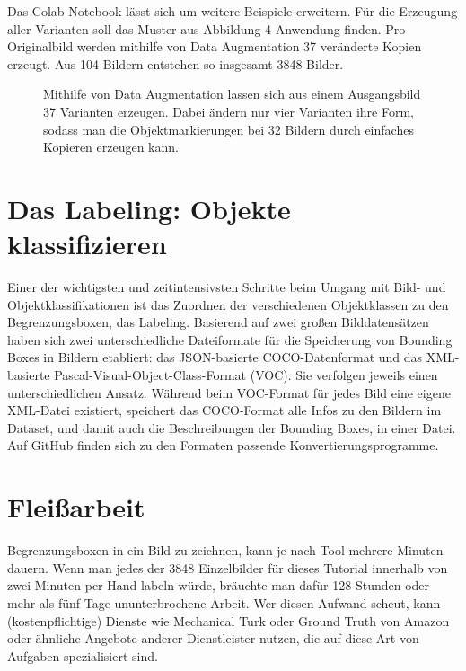 Das Colab-Notebook lässt sich um weitere Beispiele erweitern. Für die Erzeugung aller Varianten soll das Muster aus Abbildung 4 Anwendung finden. Pro Originalbild werden mithilfe von Data Augmentation 37 veränderte Kopien erzeugt. Aus 104 Bildern entstehen so insgesamt 3848 Bilder. 


\begin{figure}
	
	
	\caption{Mithilfe von Data Augmentation lassen sich aus einem Ausgangsbild 37 Varianten erzeugen. Dabei ändern nur vier Varianten ihre Form, sodass man die Objektmarkierungen bei 32 Bildern durch einfaches Kopieren erzeugen kann.}
\end{figure} 

\section{Das Labeling: Objekte klassifizieren}

Einer der wichtigsten und zeitintensivsten Schritte beim Umgang mit Bild- und Objektklassifikationen ist das Zuordnen der verschiedenen Objektklassen zu den Begrenzungsboxen, das Labeling. 
Basierend auf zwei großen Bilddatensätzen haben sich zwei unterschiedliche Dateiformate für die Speicherung von Bounding Boxes in Bildern etabliert: das JSON-basierte COCO-Datenformat und das XML-basierte Pascal-Visual-Object-­Class-Format (VOC). Sie verfolgen jeweils einen unterschiedlichen Ansatz. Während beim VOC-Format für jedes Bild eine eigene XML-Datei existiert, speichert das COCO-Format alle Infos zu den Bildern im Dataset, und damit auch die Beschreibungen der Bounding Boxes, in einer Datei. Auf GitHub finden sich zu den Formaten passende Konvertierungsprogramme. 

\section{Fleißarbeit}

Begrenzungsboxen in ein Bild zu zeichnen, kann je nach Tool mehrere Minuten dauern. Wenn man jedes der 3848 Einzelbilder für dieses Tutorial innerhalb von zwei Minuten per Hand labeln würde, bräuchte man dafür 128 Stunden oder mehr als fünf Tage ununterbrochene Arbeit. Wer diesen Aufwand scheut, kann (kostenpflichtige) Dienste wie Mechanical Turk oder Ground Truth von Amazon oder ähnliche Angebote anderer Dienstleister nutzen, die auf diese Art von Aufgaben spezialisiert sind. 

